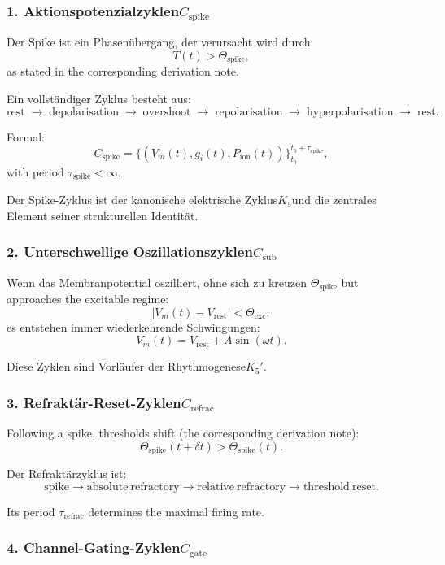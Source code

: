 \subsubsection{1. Aktionspotenzialzyklen$C_{\mathrm{spike}}$}

Der Spike ist ein Phasenübergang, der verursacht wird durch:
\[
  T(t) > \Theta_{\mathrm{spike}},
\]
as stated in the corresponding derivation note.

Ein vollständiger Zyklus besteht aus:
\[
  \mathrm{rest} 
  \;\to\;
  \mathrm{depolarisation}
  \;\to\;
  \mathrm{overshoot}
  \;\to\;
  \mathrm{repolarisation}
  \;\to\;
  \mathrm{hyperpolarisation}
  \;\to\;
  \mathrm{rest}.
\]

Formal:
\[
  C_{\mathrm{spike}}
  =\{(V_m(t), g_i(t), P_{\mathrm{ion}}(t))\}_{t_0}^{t_0+\tau_{\mathrm{spike}}},
\]
with period $\tau_{\mathrm{spike}} < \infty$.

Der Spike-Zyklus ist der kanonische elektrische Zyklus$K_5$und die
zentrales Element seiner strukturellen Identität.

\subsubsection{2. Unterschwellige Oszillationszyklen$C_{\mathrm{sub}}$}

Wenn das Membranpotential oszilliert, ohne sich zu kreuzen
$\Theta_{\mathrm{spike}}$ but approaches the excitable regime:
\[
  |V_m(t) - V_{\mathrm{rest}}| < \Theta_{\mathrm{exc}},
\]
es entstehen immer wiederkehrende Schwingungen:
\[
  V_m(t) = V_{\mathrm{rest}} + A\sin(\omega t).
\]

Diese Zyklen sind Vorläufer der Rhythmogenese$K_5'$.

\subsubsection{3. Refraktär-Reset-Zyklen$C_{\mathrm{refrac}}$}

Following a spike, thresholds shift (the corresponding derivation note):
\[
  \Theta_{\mathrm{spike}}(t+\delta t)
  >
  \Theta_{\mathrm{spike}}(t).
\]

Der Refraktärzyklus ist:
\[
  \mathrm{spike} 
  \to 
  \mathrm{absolute\ refractory}
  \to
  \mathrm{relative\ refractory}
  \to
  \mathrm{threshold\ reset}.
\]

Its period $\tau_{\mathrm{refrac}}$ determines the maximal firing rate.

\subsubsection{4. Channel-Gating-Zyklen$C_{\mathrm{gate}}$}

